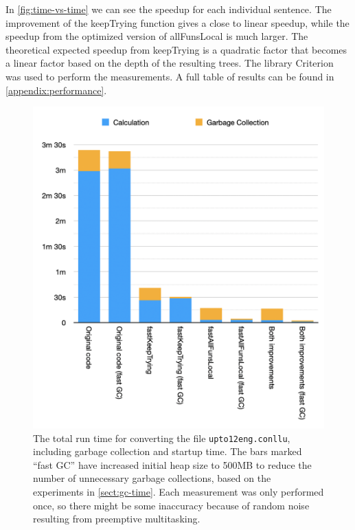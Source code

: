 In \autoref{fig:time-vs-time} we can see the speedup for each individual sentence. The improvement of the keepTrying function gives a close to linear speedup, while the speedup from the optimized version of allFunsLocal is much larger. The theoretical expected speedup from keepTrying is a quadratic factor that becomes a linear factor based on the depth of the resulting trees. The library Criterion\protect\footnotemark{} was used to perform the measurements. A full table of results can be found in \autoref{appendix:performance}.
\begin{figure}
    \centering
    \includegraphics[scale=0.75]{thesis/figure/Time-including-GC.png}
    \caption[The total run time for converting the file \texttt{upto12eng.conllu}, including garbage collection and startup time.]{The total run time for converting the file \texttt{upto12eng.conllu}, including garbage collection and startup time. The bars marked ``fast GC'' have increased initial heap size to 500MB to reduce the number of unnecessary garbage collections, based on the experiments in \autoref{sect:gc-time}. Each measurement was only performed once, so there might be some inaccuracy because of random noise resulting from preemptive multitasking.}
    \label{fig:time-including-gc}
\end{figure}
